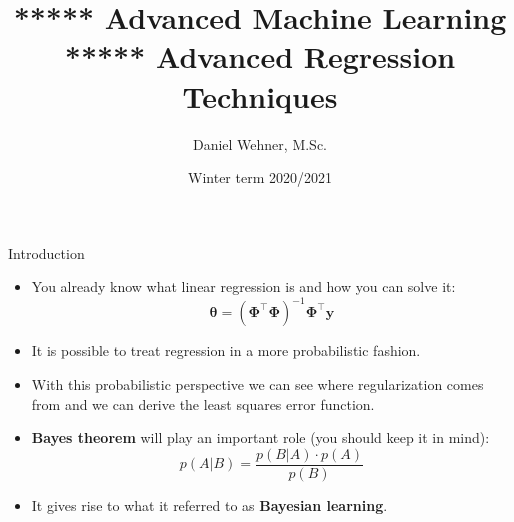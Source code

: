 




\title[Advanced Regression Techniques]{***** Advanced Machine Learning ***** Advanced Regression Techniques}
\author{Daniel Wehner, M.Sc.}
\date{Winter term 2020/2021}




\dwPrintTitle

\dwPrintToc


\begin{dwHeaderFrame}{Introduction}
	\begin{itemize}
		\item You already know what linear regression is and how you can solve it:
		\begin{equation}
			\bm{\theta} = (\bm{\Phi}^{\intercal} \bm{\Phi})^{-1} \bm{\Phi}^{\intercal} \bm{y}
		\end{equation}
		\item It is possible to treat regression in a more probabilistic fashion.
		\item With this probabilistic perspective we can see where regularization comes from and we can derive the least squares error function.
		\item \textbf{Bayes theorem} will play an important role (you should keep it in mind):
		\begin{equation}
			p(A \vert B) = \frac{p(B \vert A) \cdot p(A)}{p(B)}
		\end{equation}
		\item It gives rise to what it referred to as \textbf{Bayesian learning}.
	\end{itemize}
\end{dwHeaderFrame}


